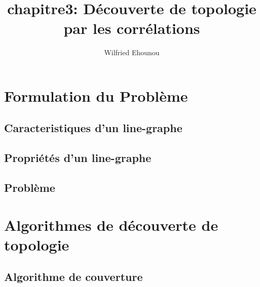 \documentclass[onecolumn, 12pt]{book}
\title{chapitre3: D\'ecouverte de topologie par les corr\'elations}
\author{Wilfried Ehounou}
\date{\oldstylenums{\today}}
\begin{document}
\maketitle
\section{Formulation du Probl\`eme}

	

	\subsection{Caracteristiques d'un line-graphe}
		

	\subsection{Propri\'et\'es d'un line-graphe}
		

	\subsection{Probl\`eme}
		

\section{Algorithmes de d\'ecouverte de topologie}

	
	\subsection{Algorithme de couverture}
\end{document}
